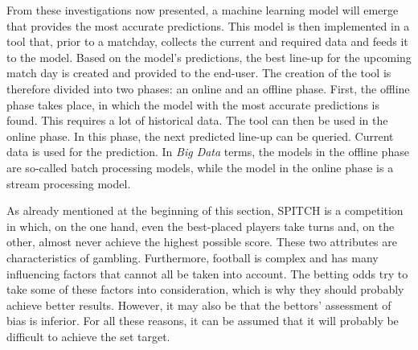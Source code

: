 From these investigations now presented, a machine learning model will emerge that provides the most accurate predictions. This model is then implemented in a tool that, prior to a matchday, collects the current and required data and feeds it to the model. Based on the model's predictions, the best line-up for the upcoming match day is created and provided to the end-user. The creation of the tool is therefore divided into two phases: an online and an offline phase. First, the offline phase takes place, in which the model with the most accurate predictions is found. This requires a lot of historical data. The tool can then be used in the online phase. In this phase, the next predicted line-up can be queried. Current data is used for the prediction. In \emph{Big Data} terms, the models in the offline phase are so-called batch processing models, while the model in the online phase is a stream processing model.

As already mentioned at the beginning of this section, SPITCH is a competition in which, on the one hand, even the best-placed players take turns and, on the other, almost never achieve the highest possible score. These two attributes are characteristics of gambling. Furthermore, football is complex and has many influencing factors that cannot all be taken into account. The betting odds try to take some of these factors into consideration, which is why they should probably achieve better results. However, it may also be that the bettors' assessment of bias is inferior. For all these reasons, it can be assumed that it will probably be difficult to achieve the set target. 

